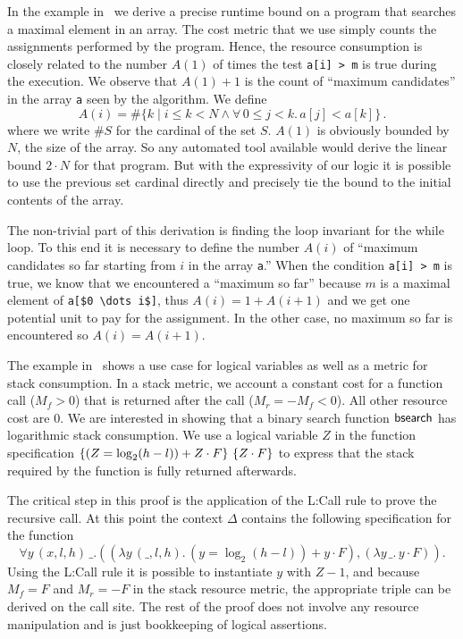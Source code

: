 \documentclass[nocopyrightspace,preprint]{sigplanconf}
\newcommand{\pref}[1]{\prettyref{#1}}
\begin{document}
In the example in~\pref{fig:xmplmax} we derive a precise runtime
bound on a program that searches a maximal element in an array.  The
cost metric that we use simply counts the assignments performed by the
program.  Hence, the resource consumption is closely related to the
number $A(1)$ of times the test \lstinline{a[i] > m} is true during the
execution.
%
We observe that $A(1)+1$ is the count of ``maximum candidates'' in the
array \lstinline{a} seen by the algorithm. We define
$$
 A(i) =  \# \{ k \mid i \le k < N \land \forall\, 0 \le j < k.\, a[j] < a[k] \} \, .
$$
where we write $\# S$ for the cardinal of the set $S$.  $A(1)$ is
obviously bounded by $N$, the size of the array.  So any automated tool
available would derive the linear bound $2 \cdot N$ for that program.
But with the expressivity of our logic it is possible to use the
previous set cardinal directly and precisely tie the bound to the
initial contents of the array.

The non-trivial part of this derivation is finding the loop
invariant for the while loop. To this end
it is necessary to define the number $A(i)$ of ``maximum candidates so far
starting from $i$ in the array \lstinline{a}.''  When the condition
\lstinline{a[i] > m} is true, we know that we encountered a ``maximum
so far'' because $m$ is a maximal element of \lstinline{a[$0 \dots i$]},
thus $A(i) = 1 + A(i+1)$ and we get one potential unit to pay for the
assignment.  In the other case, no maximum so far is encountered so
$A(i) = A(i+1)$.  %

The example in~\pref{fig:xmplbs} shows a use case for logical
variables as well as a metric for stack consumption. In a stack
metric, we account a constant cost for a function call ($M_f>0$) that
is returned after the call ($M_r = -M_f <0$).  All other resource cost
are $0$.  We are interested in showing that a binary search function
$\mathsf{bsearch}$ has logarithmic stack consumption.  We use a logical
variable $Z$ in the function specification $\{(Z = \log_2(h-l))
  + Z \cdot F\}\, \, \{Z \cdot F\}$ to express that the stack required by the
function is fully returned afterwards.

The critical step in this proof is the application of the
{\sc L:Call} rule to prove the recursive call.  At this point
the context $\Delta$ contains the following specification
for the function 
$$
  \forall y \, (x,l,h) \, \_.
  ( (\lambda y \, (\_, l, h) .\, (y {=} \log_2(h {-} l)) + y {\cdot} F)
  , (\lambda y \, \_ .\, y {\cdot} F)
  ).
$$
Using the {\sc L:Call} rule it is possible to instantiate
$y$ with $Z - 1$, and because $M_f = F$ and $M_r = -F$ in
the stack resource metric, the appropriate triple can be
derived on the call site.  The rest of the proof does not
involve any resource manipulation and is just bookkeeping
of logical assertions.
\end{document}
